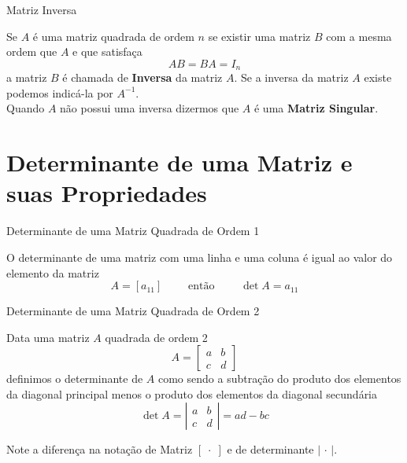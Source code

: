 \begin{exemplos}
\end{exemplos}

\begin{teoria}{Matriz Inversa}
    
    Se $A$ é uma matriz quadrada de ordem $n$ se existir uma matriz $B$ com a mesma ordem que $A$ e que satisfaça
    \[ AB = BA = I_n \]
    a matriz $B$ é chamada de \textbf{Inversa} da matriz $A$.    
    Se a inversa da matriz $A$ existe podemos indicá-la por $A^{-1}$. 
    \\
    
    Quando $A$ não possui uma inversa dizermos que $A$ é uma \textbf{Matriz Singular}.
    
\end{teoria}

\section{Determinante de uma Matriz e suas Propriedades}

\begin{teoria}{Determinante de uma Matriz Quadrada de Ordem 1}

  O determinante de uma matriz com uma linha e uma coluna é igual ao valor do elemento da matriz
  \[  A = [a_{11}]  \qquad \text{ então } \qquad  \det A = a_{11} \]

\end{teoria}

\begin{teoria}{Determinante de uma Matriz Quadrada de Ordem 2}
    
    Data uma matriz $A$ quadrada de ordem 2 
    \[ A = \left[
        \begin{array}{cc}
            a & b \\ 
            c & d
        \end{array} 
        \right]
    \]
    definimos o determinante de $A$ como sendo a subtração do produto dos elementos da diagonal principal menos o produto dos elementos da diagonal secundária
    \[ \det A = \left|
        \begin{array}{cc}
            a & b \\ 
            c & d
        \end{array} 
        \right|
        = ad - bc    
    \]
    
    Note a diferença na notação de Matriz $[\;\cdot\;]$ e de determinante $|\,\cdot\,|$.
    
\end{teoria}

